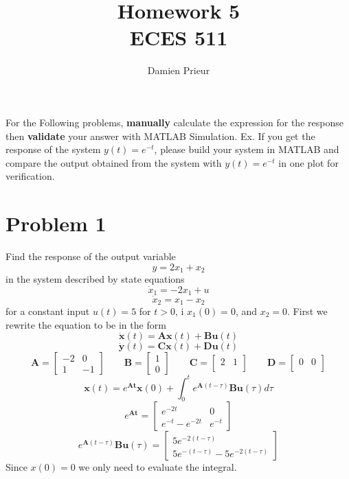 \documentclass{article}
\author{Damien Prieur}
\title{Homework 5 \\ ECES 511}
\date{}
\begin{document}
\maketitle

\noindent
For the Following problems, \textbf{manually} calculate the expression for the response then \textbf{validate} your answer with MATLAB Simulation.
Ex. If you get the response of the system $y(t) = e^{-t}$, please build your system in MATLAB and compare the output obtained from the system with $y(t) = e^{-t}$ in one plot for verification.
\section*{Problem 1}
Find the response of the output variable
$$ y = 2x_1+x_2 $$
in the system described by state equations
$$ \dot{x}_1 = -2x_1 + u $$
$$ \dot{x}_2 = x_1 - x_2 $$
for a constant input $u(t)=5$ for $t>0$, i $x_1(0)=0$, and $x_2=0$.
\newline
\newline
First we rewrite the equation to be in the form
$$ \dot{\mathbf{x}}(t)= \mathbf{A}\mathbf{x}(t) + \mathbf{B}\mathbf{u}(t) $$
$$ \dot{\mathbf{y}}(t)= \mathbf{C}\mathbf{x}(t) + \mathbf{D}\mathbf{u}(t) $$
$$
\mathbf{A}
=
\begin{bmatrix}
-2 &  0 \\
 1 & -1
\end{bmatrix}
\qquad
\mathbf{B}
=
\begin{bmatrix}
 1  \\
 0
\end{bmatrix}
\qquad
\mathbf{C}
=
\begin{bmatrix}
 2 & 1 \\
\end{bmatrix}
\qquad
\mathbf{D}
=
\begin{bmatrix}
 0 & 0 \\
\end{bmatrix}
$$
$$
\mathbf{x}(t)
=
e^{\mathbf{At}}\mathbf{x}(0) + \int_0^t e^{\mathbf{A}(t-\tau)}\mathbf{B}\mathbf{u}(\tau) d\tau
$$
$$
e^{\mathbf{At}}
=
\begin{bmatrix}
e^{-2t} & 0 \\
e^{-t}-e^{-2t} & e^{-t}
\end{bmatrix}
$$
$$
e^{\mathbf{A}(t-\tau)}\mathbf{B}\mathbf{u}(\tau)
=
\begin{bmatrix}
5e^{-2(t-\tau)} \\
5e^{-(t-\tau)}-5e^{-2(t-\tau)}
\end{bmatrix}
$$
Since $x(0)=0$ we only need to evaluate the integral.
\end{document}
